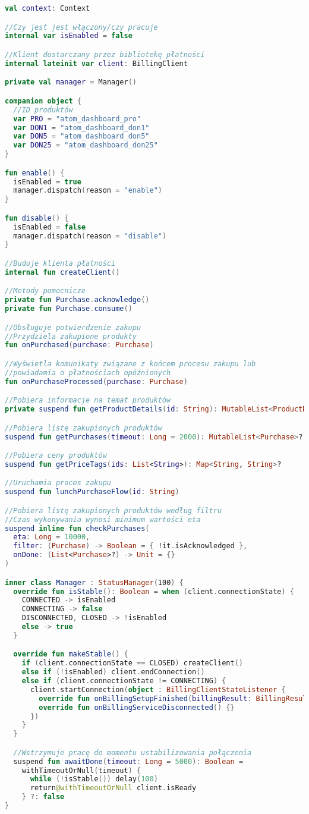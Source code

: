 \begin{lstlisting}[language=Kotlin]
val context: Context

//Czy jest jest włączony/czy pracuje
internal var isEnabled = false

//Klient dostarczany przez bibliotekę płatności
internal lateinit var client: BillingClient

private val manager = Manager()

companion object {
  //ID produktów
  var PRO = "atom_dashboard_pro"
  var DON1 = "atom_dashboard_don1"
  var DON5 = "atom_dashboard_don5"
  var DON25 = "atom_dashboard_don25"
}

fun enable() {
  isEnabled = true
  manager.dispatch(reason = "enable")
}

fun disable() {
  isEnabled = false
  manager.dispatch(reason = "disable")
}

//Buduje klienta płatności
internal fun createClient()

//Metody pomocnicze
private fun Purchase.acknowledge()
private fun Purchase.consume()

//Obsługuje potwierdzenie zakupu
//Przydziela zakupione produkty
fun onPurchased(purchase: Purchase)

//Wyświetla komunikaty związane z końcem procesu zakupu lub
//powiadamia o płatnościach opóźnionych
fun onPurchaseProcessed(purchase: Purchase)

//Pobiera informacje na temat produktów 
private suspend fun getProductDetails(id: String): MutableList<ProductDetails>?

//Pobiera listę zakupionych produktów
suspend fun getPurchases(timeout: Long = 2000): MutableList<Purchase>?

//Pobiera ceny produktów
suspend fun getPriceTags(ids: List<String>): Map<String, String>?

//Uruchamia proces zakupu
suspend fun lunchPurchaseFlow(id: String)

//Pobiera listę zakupionych produktów według filtru
//Czas wykonywania wynosi minimum wartości eta
suspend inline fun checkPurchases(
  eta: Long = 10000,
  filter: (Purchase) -> Boolean = { !it.isAcknowledged },
  onDone: (List<Purchase>?) -> Unit = {}
)

inner class Manager : StatusManager(100) {
  override fun isStable(): Boolean = when (client.connectionState) {
    CONNECTED -> isEnabled
    CONNECTING -> false
    DISCONNECTED, CLOSED -> !isEnabled
    else -> true
  }

  override fun makeStable() {
    if (client.connectionState == CLOSED) createClient()
    else if (!isEnabled) client.endConnection()
    else if (client.connectionState != CONNECTING) {
      client.startConnection(object : BillingClientStateListener {
        override fun onBillingSetupFinished(billingResult: BillingResult) {}
        override fun onBillingServiceDisconnected() {}
      })
    }
  }

  //Wstrzymuje pracę do momentu ustabilizowania połączenia
  suspend fun awaitDone(timeout: Long = 5000): Boolean = 
    withTimeoutOrNull(timeout) {
      while (!isStable()) delay(100)
      return@withTimeoutOrNull client.isReady
    } ?: false
}
\end{lstlisting}

